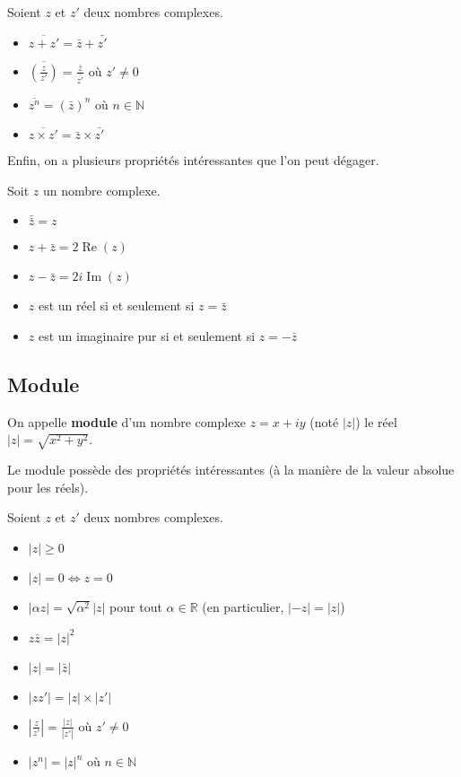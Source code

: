 	\begin{formula}[Relations]
		Soient $z$ et $z'$ deux nombres complexes.
		\begin{itemize}
			\item $\overline{z + z'} = \bar{z} + \bar{z'}$
			\item $\overline{\left(\frac{z}{z'}\right)} = \frac{\bar{z}}{\bar{z'}}$ où $z' \neq 0$
			\item $\overline{z^n} = (\bar{z})^n$ où $n \in \mathbb{N}$
			\item $\overline{z \times z'} = \bar{z} \times \bar{z'}$
		\end{itemize}
	\end{formula}

	Enfin, on a plusieurs propriétés intéressantes que l'on peut dégager.

	\begin{formula}[Propriétés]
		Soit $z$ un nombre complexe.
		\begin{itemize}
			\item $\bar{\bar{z}} = z$
			\item $z + \bar{z} = 2 \operatorname{Re}(z)$
			\item $z - \bar{z} = 2i \operatorname{Im}(z)$
			\item $z$ est un réel si et seulement si $z = \bar{z}$
			\item $z$ est un imaginaire pur si et seulement si $z = -\bar{z}$
		\end{itemize}
	\end{formula}

	\subsection{Module}
	\label{module}

	\begin{formula}[Définition]
		On appelle \textbf{module} d'un nombre complexe $z = x + iy$ (noté $|z|$) le réel $|z| = \sqrt{x^2 + y^2}$.
	\end{formula}

	Le module possède des propriétés intéressantes (à la manière de la valeur absolue pour les réels).

	\begin{formula}[Formules]
		Soient $z$ et $z'$ deux nombres complexes.
		\begin{itemize}
			\item $|z| \geq 0$
			\item $|z| = 0 \iff z = 0$
			\item $|\alpha z| = \sqrt{\alpha^2} |z|$ pour tout $\alpha \in \mathbb{R}$ (en particulier, $|-z| = |z|$)
			\item $z\bar{z} = |z|^2$
			\item $|z| = |\bar{z}|$
			\item $|zz'| = |z| \times |z'|$
			\item $\left|\frac{z}{z'}\right| = \frac{|z|}{|z'|}$ où $z' \neq 0$
			\item $|z^n| = |z|^n$ où $n \in \mathbb{N}$
		\end{itemize}
	\end{formula}

